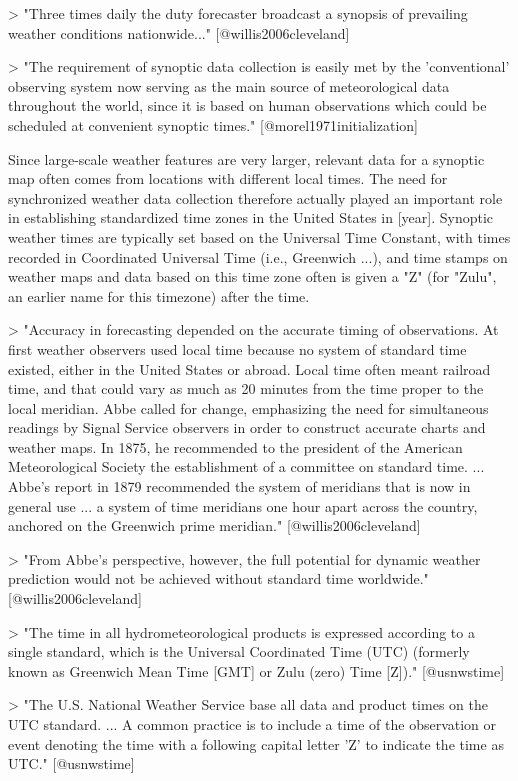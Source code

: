 > "Three times daily the duty forecaster broadcast a synopsis of prevailing
weather conditions nationwide..." [@willis2006cleveland]

> "The requirement of synoptic data collection is easily met by the
'conventional' observing system now serving as the main source of meteorological 
data throughout the world, since it is based on human observations which could 
be scheduled at convenient synoptic times." [@morel1971initialization]

Since large-scale weather features are very larger, relevant data for a synoptic
map often comes from locations with different local times. The need for
synchronized weather data collection therefore actually played an important role
in establishing standardized time zones in the United States in [year]. Synoptic
weather times are typically set based on the Universal Time Constant, with times
recorded in Coordinated Universal Time (i.e., Greenwich ...), and time stamps on
weather maps and data based on this time zone often is given a "Z" (for "Zulu",
an earlier name for this timezone) after the time.

> "Accuracy in forecasting depended on the accurate timing of observations. At
first weather observers used local time because no system of standard time
existed, either in the United States or abroad. Local time often meant railroad
time, and that could vary as much as 20 minutes from the time proper to the
local meridian. Abbe called for change, emphasizing the need for simultaneous
readings by Signal Service observers in order to construct accurate charts and
weather maps. In 1875, he recommended to the president of the American
Meteorological Society the establishment of a committee on standard time. ...
Abbe's report in 1879 recommended the system of meridians that is now in general
use ... a system of time meridians one hour apart across the country, anchored
on the Greenwich prime meridian." [@willis2006cleveland]

> "From Abbe's perspective, however, the full potential for dynamic weather
prediction would not be achieved without standard time worldwide."
[@willis2006cleveland]

> "The time in all hydrometeorological products is expressed according to 
a single standard, which is the Universal Coordinated Time (UTC) 
(formerly known as Greenwich Mean Time [GMT] or Zulu (zero) Time [Z])."
[@usnwstime]

> "The U.S. National Weather Service base all data and product times on the 
UTC standard. ... A common practice is to include a time of the observation 
or event denoting the time with a following capital letter 'Z' to indicate the 
time as UTC." [@usnwstime]


